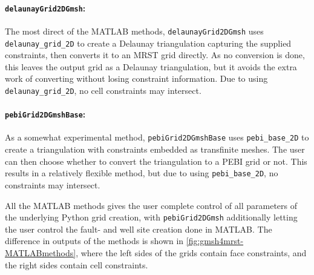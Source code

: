 \paragraph{\texttt{delaunayGrid2DGmsh}:}
The most direct of the MATLAB methods, \verb|delaunayGrid2DGmsh| uses \verb|delaunay_grid_2D| to create a Delaunay triangulation capturing the supplied constraints, then converts it to an MRST grid directly. As no conversion is done, this leaves the output grid as a Delaunay triangulation, but it avoids the extra work of converting without losing constraint information. Due to using \verb|delaunay_grid_2D|, no cell constraints may intersect.

\paragraph{\texttt{pebiGrid2DGmshBase}:}
As a somewhat experimental method, \verb|pebiGrid2DGmshBase| uses \verb|pebi_base_2D| to create a triangulation with constraints embedded as transfinite meshes. The user can then choose whether to convert the triangulation to a PEBI grid or not. This results in a relatively flexible method, but due to using \verb|pebi_base_2D|, no constraints may intersect.

All the MATLAB methods gives the user complete control of all parameters of the underlying Python grid creation, with \verb|pebiGrid2DGmsh| additionally letting the user control the fault- and well site creation done in MATLAB. The difference in outputs of the methods is shown in \autoref{fig:gmsh4mrst-MATLABmethods}, where the left sides of the grids contain face constraints, and the right sides contain cell constraints.

